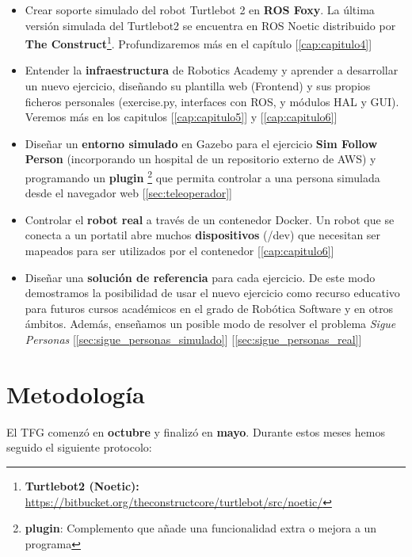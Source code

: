 \begin{itemize}
	\item Crear soporte simulado del robot Turtlebot 2 en \textbf{ROS Foxy}. La última versión simulada del Turtlebot2 se encuentra en ROS Noetic distribuido por \textbf{The Construct}\footnote{\textbf{Turtlebot2 (Noetic):} \url{https://bitbucket.org/theconstructcore/turtlebot/src/noetic/}}. Profundizaremos más en el capítulo [\ref{cap:capitulo4}]
	\item Entender la \textbf{infraestructura} de Robotics Academy y aprender a desarrollar un nuevo ejercicio, diseñando su plantilla web (Frontend) y sus propios ficheros personales (exercise.py, interfaces con ROS, y módulos HAL y GUI). Veremos más en los capitulos [\ref{cap:capitulo5}] y [\ref{cap:capitulo6}]
	\item Diseñar un \textbf{entorno simulado} en Gazebo para el ejercicio \textbf{Sim Follow Person} (incorporando un hospital de un repositorio externo de AWS) y programando un \textbf{plugin} \footnote{\textbf{plugin}: Complemento que añade una funcionalidad extra o mejora a un programa} que permita controlar a una persona simulada desde el navegador web [\ref{sec:teleoperador}]
	\item Controlar el \textbf{robot real} a través de un contenedor Docker. Un robot que se conecta a un portatil abre muchos \textbf{dispositivos} (/dev) que necesitan ser mapeados para ser utilizados por el contenedor [\ref{cap:capitulo6}]
	\item Diseñar una \textbf{solución de referencia} para cada ejercicio. De este modo demostramos la posibilidad de usar el nuevo ejercicio como recurso educativo para futuros cursos académicos en el grado de Robótica Software y en otros ámbitos. Además, enseñamos un posible modo de resolver el problema \textit{Sigue Personas} [\ref{sec:sigue_personas_simulado}] [\ref{sec:sigue_personas_real}]
\end{itemize}



\section{Metodología}
\label{sec:metodologia}
El TFG comenzó en \textbf{octubre} y finalizó en \textbf{mayo}. Durante estos meses hemos seguido el siguiente protocolo:

